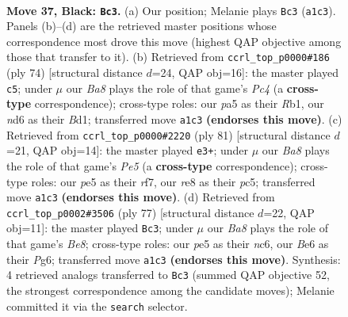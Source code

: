 \documentclass[11pt]{article}
\begin{document}
\clearpage

\begin{figure}[p]\centering
\begin{subfigure}{0.46\textwidth}\centering
\resizebox{\linewidth}{!}{%
\newchessgame
\chessboard[
  setfen={4R3/5pk1/p1pNb3/P3P1p1/1P6/8/8/b4K2 b - - 2 37},
  showmover=false,
  pgfstyle=straightmove, color=movearrow, markmove={a1-c3}
]}
\caption{}
\end{subfigure}\hfill
\begin{subfigure}{0.46\textwidth}\centering
\resizebox{\linewidth}{!}{%
\newchessgame
\chessboard[
  setfen={8/2p5/1p3k1p/8/P1PPrn2/8/5K1P/1R1B4 w - - 1 38},
  showmover=false,
  pgfstyle=straightmove, color=movearrow, markmove={c4-c5}
]}
\caption{}
\end{subfigure}
\\[4pt]
\begin{subfigure}{0.46\textwidth}\centering
\resizebox{\linewidth}{!}{%
\newchessgame
\chessboard[
  setfen={2k5/1p3R2/p2b4/P1P5/1P2p3/6r1/1N1K4/8 b - - 1 41},
  showmover=false,
  pgfstyle=straightmove, color=movearrow, markmove={e4-e3}
]}
\caption{}
\end{subfigure}\hfill
\begin{subfigure}{0.46\textwidth}\centering
\resizebox{\linewidth}{!}{%
\newchessgame
\chessboard[
  setfen={4k3/7p/2Np2p1/p2P1P2/2P5/1P6/8/3Kb3 b - - 1 39},
  showmover=false,
  pgfstyle=straightmove, color=movearrow, markmove={e1-c3}
]}
\caption{}
\end{subfigure}
\caption{\textbf{Move 37, Black: \texttt{Bc3}.} (a) Our position; Melanie plays \texttt{Bc3} (\texttt{a1c3}). Panels (b)--(d) are the retrieved master positions whose correspondence most drove this move (highest QAP objective among those that transfer to it). (b) Retrieved from \texttt{ccrl\_top\_p0000\#186} (ply 74) [structural distance $d$=24, QAP obj=16]: the master played \texttt{c5}; under $\mu$ our \emph{Ba8} plays the role of that game's \emph{Pc4} (a \textbf{cross-type} correspondence); cross-type roles: our \emph{p}a5 as their \emph{R}b1, our \emph{n}d6 as their \emph{B}d1; transferred move \texttt{a1c3} \textbf{(endorses this move)}. (c) Retrieved from \texttt{ccrl\_top\_p0000\#2220} (ply 81) [structural distance $d$=21, QAP obj=14]: the master played \texttt{e3+}; under $\mu$ our \emph{Ba8} plays the role of that game's \emph{Pe5} (a \textbf{cross-type} correspondence); cross-type roles: our \emph{p}e5 as their \emph{r}f7, our \emph{r}e8 as their \emph{p}c5; transferred move \texttt{a1c3} \textbf{(endorses this move)}. (d) Retrieved from \texttt{ccrl\_top\_p0002\#3506} (ply 77) [structural distance $d$=22, QAP obj=11]: the master played \texttt{Bc3}; under $\mu$ our \emph{Ba8} plays the role of that game's \emph{Be8}; cross-type roles: our \emph{p}e5 as their \emph{n}c6, our \emph{B}e6 as their \emph{P}g6; transferred move \texttt{a1c3} \textbf{(endorses this move)}. Synthesis: 4 retrieved analogs transferred to \texttt{Bc3} (summed QAP objective 52, the strongest correspondence among the candidate moves); Melanie committed it via the \texttt{search} selector.}
\label{fig:thought-m73}
\end{figure}
\end{document}
